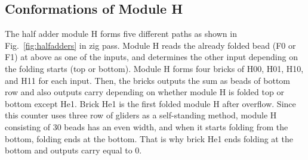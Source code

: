 \documentclass[runningheads]{llncs}
\begin{document}
\subsection{Conformations of Module H}
The half adder module H forms five different paths as shown in Fig.~\ref{fig:halfadders} in zig pass.
Module H reads the already folded bead (F0 or F1) at above as one of the inputs, and determines the other input depending on the folding starts (top or bottom).
Module H forms four bricks of H00, H01, H10, and H11 for each input.
Then, the bricks outputs the sum as beads of bottom row and also outputs carry depending on whether module H is folded top or bottom except He1.
Brick He1 is the first folded module H after overflow.
Since this counter uses three row of gliders as a self-standing method, module H consisting of 30 beads has an even width, and when it starts folding from the bottom, folding ends at the bottom.
That is why brick He1 ends folding at the bottom and outputs carry equal to 0.
\end{document}
